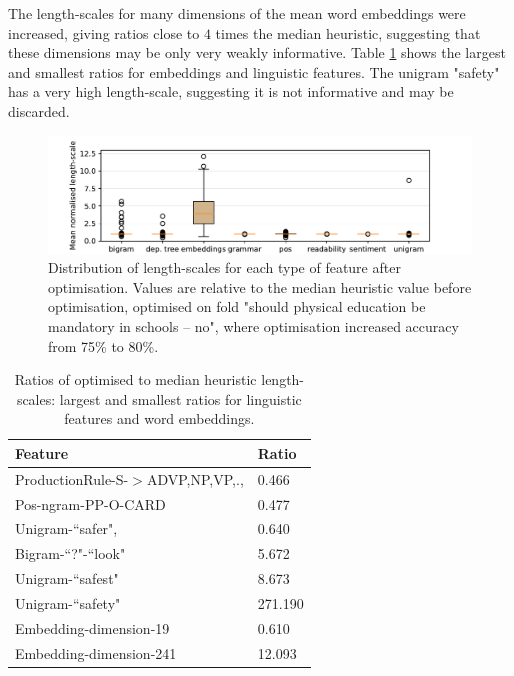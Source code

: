 The length-scales for many dimensions of the mean word embeddings were increased,
giving ratios close to $4$ times the median heuristic, suggesting that these dimensions may be
only very weakly informative. Table \ref{tab:extreme_features} shows the largest
and smallest ratios for embeddings and linguistic features. The unigram "safety" has
a very high length-scale, suggesting it is not informative and may be discarded. 
\begin{figure}[h]
\includegraphics[width=\columnwidth, clip=True, trim=32 0 57 0]{figures/features/boxplot}
\caption{Distribution of length-scales for each type of feature after optimisation. 
Values are relative to the median heuristic value before optimisation, optimised 
on fold "should physical education be mandatory in schools -- no", where 
optimisation increased accuracy from 75\% to 80\%. }
\label{fig:boxplot}
\end{figure}
\begin{table}
\small
  \begin{tabularx}{\columnwidth}{l | X }
  Feature & Ratio\\
  \hline
  ProductionRule-S-$>$ADVP,NP,VP,., & 0.466 \nonumber\\
  Pos-ngram-PP-O-CARD & 0.477 \nonumber\\
  Unigram-``safer", & 0.640 \nonumber\\
  \hline
  Bigram-``?"-``look" & 5.672 \nonumber\\
  Unigram-``safest" & 8.673 \nonumber\\
  Unigram-``safety" & 271.190 \nonumber\\
  \hline
  Embedding-dimension-19 & 0.610 \nonumber\\
  \hline
  Embedding-dimension-241 & 12.093 \nonumber\\
  \end{tabularx}
  \caption{Ratios of optimised to median heuristic length-scales: largest and smallest
  ratios for linguistic features and word embeddings.}
  \label{tab:extreme_features}
\end{table}


